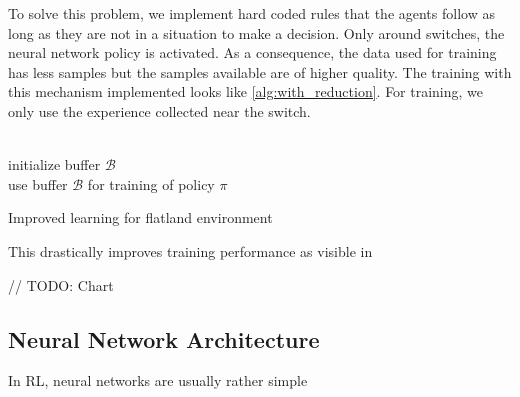 To solve this problem, we implement hard coded rules that the agents follow as long as they are not in a situation to make a decision. Only around switches, the neural network policy is activated. As a consequence, the data used for training has less samples but the samples available are of higher quality. The training with this mechanism implemented looks like \autoref{alg:with_reduction}.
For training, we only use the experience collected near the switch.\\\\
\begin{algorithm}[H]
	initialize buffer $\mathcal{B}$\\
	use buffer $\mathcal{B}$ for training of policy $\pi$

	\caption{Improved learning for flatland environment}
	\label{alg:with_reduction}
\end{algorithm}
This drastically improves training performance as visible in

// TODO: Chart


\subsection*{Neural Network Architecture}\label{network_architecture}
In RL, neural networks are usually rather simple


